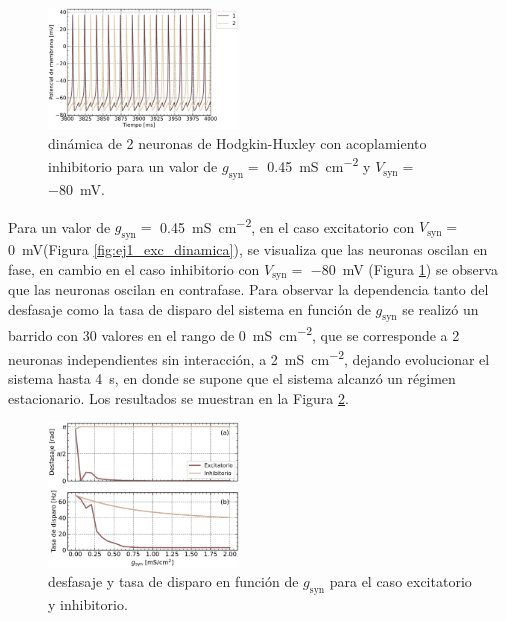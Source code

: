 \documentclass[11pt, twocolumn]{article}
\begin{document}
\begin{figure} [htbp]
    \centering
    \includegraphics[width=0.45\textwidth]{figuras/inhibitorio.pdf}
    \caption{dinámica de 2 neuronas de Hodgkin-Huxley con acoplamiento inhibitorio para un valor de \(g_\text{syn} =\) \SI{0.45}{\milli\siemens\per \centi\meter\squared} y \(V_\text{syn} =\) \SI{-80}{\milli\volt}.}
    \label{fig:ej1_inh_dinamica}
\end{figure}

Para un valor de \(g_\text{syn} =\) \SI{0.45}{\milli\siemens\per \centi\meter\squared}, en el caso excitatorio con \(V_\text{syn} =\) \SI{0}{\milli\volt}(Figura \ref{fig:ej1_exc_dinamica}), se visualiza que las neuronas oscilan en fase, en cambio en el caso inhibitorio con \(V_\text{syn} =\) \SI{-80}{\milli\volt} (Figura \ref{fig:ej1_inh_dinamica}) se observa que las neuronas oscilan en contrafase. Para observar la dependencia tanto del desfasaje como la tasa de disparo del sistema en función de \(g_\text{syn}\) se realizó un barrido con 30 valores en el rango de \SI{0}{\milli\siemens\per \centi\meter\squared}, que se corresponde a 2 neuronas independientes sin interacción, a \SI{2}{\milli\siemens\per \centi\meter\squared}, dejando evolucionar el sistema hasta \SI{4}{\second}, en donde se supone que el sistema alcanzó un régimen estacionario. Los resultados se muestran en la Figura \ref{fig:ej1_barrido}.

\begin{figure} [htbp]
    \centering
    \includegraphics[width=0.45\textwidth]{figuras/barrido_nsyn.pdf}
    \caption{desfasaje y tasa de disparo en función de \(g_\text{syn}\) para el caso excitatorio y inhibitorio.}
    \label{fig:ej1_barrido}
\end{figure}
\end{document}

